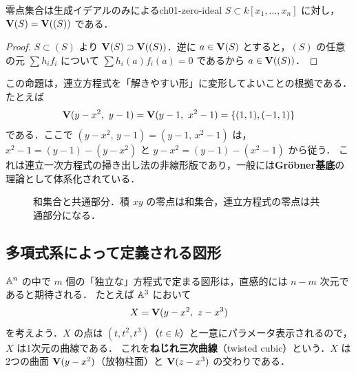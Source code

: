 \begin{myprop}{零点集合は生成イデアルのみによる}{ch01-zero-ideal}
$S\subset k[x_1,\dots,x_n]$ に対し，$\mathbf{V}(S)=\mathbf{V}((S))$ である．
\end{myprop}

\begin{proof}
$S\subset(S)$ より $\mathbf{V}(S)\supset\mathbf{V}((S))$．逆に $a\in\mathbf{V}(S)$ とすると，$(S)$ の任意の元
$\sum h_if_i$ について $\sum h_i(a)f_i(a)=0$ であるから $a\in\mathbf{V}((S))$．
\end{proof}

この命題は，連立方程式を「解きやすい形」に変形してよいことの根拠である．たとえば
\[
  \Zero(y-x^2,\ y-1)=\Zero(y-1,\ x^2-1)=\{(1,1),(-1,1)\}
\]
である．ここで $(y-x^2,\,y-1)=(y-1,\,x^2-1)$ は，$x^2-1=(y-1)-(y-x^2)$ と $y-x^2=(y-1)-(x^2-1)$ から従う．
これは連立一次方程式の掃き出し法の非線形版であり，一般には\textbf{Gröbner基底}の理論として体系化されている．

\begin{figure}[H]
\centering
{}
\caption{和集合と共通部分．積 $xy$ の零点は和集合，連立方程式の零点は共通部分になる．}
\label{fig:ch01-zero-sets}
\end{figure}

\subsection{多項式系によって定義される図形}

$\mathbb{A}^n$ の中で $m$ 個の「独立な」方程式で定まる図形は，直感的には $n-m$ 次元であると期待される．
たとえば $\mathbb{A}^3$ において
\[
  X=\mathbf{V}(y-x^2,\ z-x^3)
\]
を考えよう．$X$ の点は $(t,t^2,t^3)$（$t\in k$）と一意にパラメータ表示されるので，$X$ は1次元の曲線である．
これを\textbf{ねじれ三次曲線}（twisted cubic）という．$X$ は2つの曲面 $\mathbf{V}(y-x^2)$（放物柱面）と
$\mathbf{V}(z-x^3)$ の交わりである．

